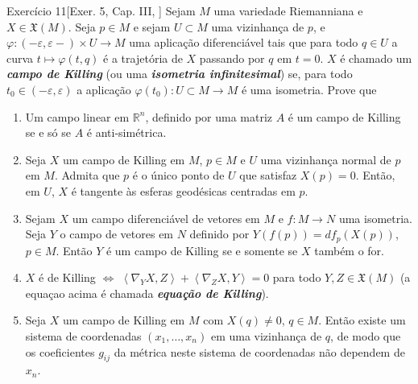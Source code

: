 \begin{thing4}{Exercício 11}[Exer. 5, Cap. III, \cite{doc}]\label{exer:11}\leavevmode
Sejam \(M\) uma variedade Riemanniana e \(X \in \mathfrak{X}(M)\). Seja \(p \in M\) e sejam \(U \subset M\) uma vizinhança de \(p\), e \(\varphi:(-\varepsilon,\varepsilon-)\times U \to M\) uma aplicação diferenciável tais que para todo \(q \in U\) a curva \(t \mapsto  \varphi(t,q)\) é a trajetória de \(X\) passando por \(q\) em \(t=0\). \(X\) é chamado um \textit{\textbf{campo de Killing}} (ou uma \textit{\textbf{isometria infinitesimal}}) se, para todo \(t_0\in (-\varepsilon,\varepsilon)\) a aplicação \(\varphi(t_0):U \subset M \to M\) é uma isometria. Prove que
\begin{enumerate}[label=(\alph*)]
\item Um campo linear em \(\mathbb{R}^n\), definido por uma matriz \(A\) é um campo de Killing se e só se \(A\) é anti-simétrica.
\item Seja \(X\) um campo de Killing em \(M\), \(p \in M\) e \(U\) uma vizinhança normal de \(p\) em \(M\). Admita que \(p\) é o único ponto de \(U\) que satisfaz \(X(p)=0\). Então, em \(U\), \(X\) é tangente às esferas geodésicas centradas em \(p\).
\item  Sejam \(X\) um campo diferenciável de vetores em \(M\) e \(f:M \to N\) uma isometria. Seja \(Y\) o campo de vetores em \(N\) definido por \(Y(f(p))=df_p(X(p))\), \(p \in M\). Então \(Y\) é um campo de Killing se e somente se \(X\) também o for.
\item \(X\) é de Killing \(\iff\) \(\left<\nabla_YX,Z\right>+\left<\nabla_ZX,Y\right>=0\) para todo \(Y,Z \in \mathfrak{X}(M)\) (a equaçao acima é chamada \textit{\textbf{equação de Killing}}).
\item Seja \(X\) um campo de Killing em \(M\) com \(X(q)\neq 0\), \(q \in M\). Então existe um sistema de coordenadas \((x_1,\ldots,x_n)\) em uma vizinhança de \(q\), de modo que os coeficientes \(g_{ij}\) da métrica neste sistema de coordenadas não dependem de \(x_n\).
\end{enumerate}
\end{thing4}

